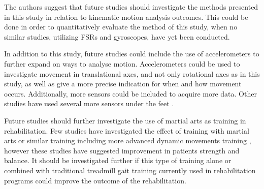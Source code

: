 The authors suggest that future studies should investigate the methods presented in this study in relation to kinematic motion analysis outcomes. This could be done in order to quantitatively evaluate the method of this study, when no similar studies, utilizing FSRs and gyroscopes, have yet been conducted. 

In addition to this study, future studies could include the use of accelerometers to further expand on ways to analyse motion. Accelerometers could be used to investigate movement in translational axes, and not only rotational axes as in this study, as well as give a more precise indication for when and how movement occurs. Additionally, more sensors could be included to acquire more data. Other studies have used several more sensors under the feet \cite{Hessert2005, Hu2018}.

Future studies should further investigate the use of martial arts as training in rehabilitation. Few studies have investigated the effect of training with martial arts or similar training including more advanced dynamic movements training \cite{Winser2018, Ding2012}, however these studies have suggested improvement in patients strength and balance. It should be investigated further if this type of training alone or combined with traditional treadmill gait training currently used in rehabilitation programs could improve the outcome of the rehabilitation.








